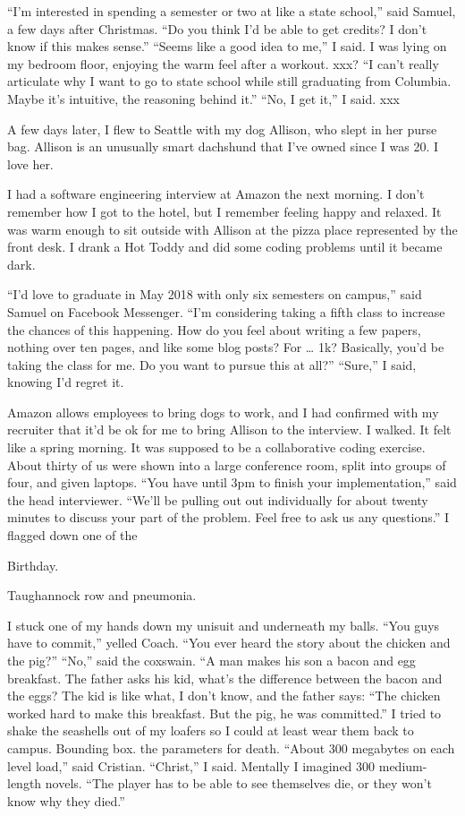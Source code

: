 \ledsection{}

``I'm interested in spending a semester or two at like a state school,'' said
Samuel, a few days after Christmas.  ``Do you think I'd be able to get credits?
I don't know if this makes sense.''
``Seems like a good idea to me,'' I said.  I
was lying on my bedroom floor, enjoying the warm feel after a workout.  xxx?
``I can't really articulate why I want to go to state school while still
graduating from Columbia.   Maybe it's intuitive, the reasoning behind it.''
``No, I get it,'' I said.  xxx

A few days later, I flew to Seattle with my dog Allison, who slept in her purse
bag.  Allison is an unusually smart dachshund that I've owned since I was 20.
I love her.  

I had a software engineering interview at Amazon the next morning.  I don't
remember how I got to the hotel, but I remember feeling happy and relaxed.  It
was warm enough to sit outside with Allison at the pizza place represented by
the front desk.   I drank a Hot Toddy and did some coding problems until it
became dark.  

``I'd love to graduate in May 2018 with only six semesters on
campus,'' said Samuel on Facebook Messenger.  ``I'm considering taking a fifth
class to increase the chances of this happening.  How do you feel about writing
a few papers, nothing over ten pages, and like some blog posts?  For … 1k?
Basically, you'd be taking the class for me.  Do you want to pursue this at
all?'' ``Sure,'' I said, knowing I'd regret it.

Amazon allows employees to bring dogs to work, and I had confirmed with my
recruiter that it'd be ok for me to bring Allison to the interview.  I walked.
It felt like a spring morning.  It was supposed to be a collaborative coding
exercise.  About thirty of us were shown into a large conference room, split
into groups of four, and given laptops.  ``You have until 3pm to finish your
implementation,'' said the head interviewer.  ``We'll be pulling out out
individually for about twenty minutes to discuss your part of the problem.
Feel free to ask us any questions.'' I flagged down one of the 


  

Birthday.

Taughannock row and pneumonia.

I stuck one of my hands down my unisuit and underneath my balls.  ``You guys
have to commit,'' yelled Coach.  ``You ever heard the story about the chicken and
the pig?'' ``No,'' said the coxswain.  ``A man makes his son a bacon and egg
breakfast.  The father asks his kid, what's the difference between the bacon
and the eggs?  The kid is like what, I don't know, and the father says: ``The
chicken worked hard to make this breakfast.  But the pig, he was committed.'' I
tried to shake the seashells out of my loafers so I could at least wear them
back to campus.  Bounding box.  the parameters for death.  ``About 300 megabytes
on each level load,'' said Cristian.  ``Christ,'' I said.  Mentally I imagined 300
medium-length novels.  ``The player has to be able to see themselves die, or
they won't know why they died.'' 

